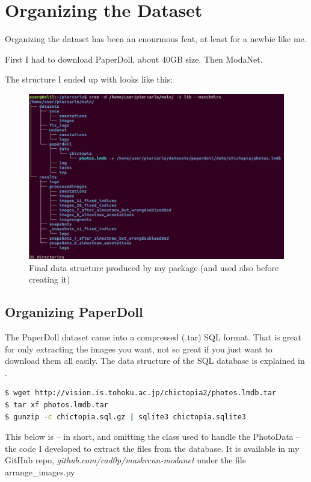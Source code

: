 \section{Organizing the Dataset}\label{s:ds-org}

Organizing the dataset has been an enourmous feat, at least for a newbie like me.

First I had to download PaperDoll, about 40GB size. Then ModaNet.

The structure I ended up with looks like this:

\begin{figure}[H]
	\centering
	\includegraphics[width=\linewidth]{images/datastructure}
	\caption{Final data structure produced by my package (and used also before creating it)}
	\label{f:datastructure}
\end{figure}


\subsection{Organizing PaperDoll}\label{s:ds-org-pd}

The PaperDoll dataset came into a compressed (.tar) SQL format. That is great for only extracting the images you want, not so great if you just want to download them all easily. The data structure of the SQL database is explained in .

\begin{lstlisting}[language=bash]
$ wget http://vision.is.tohoku.ac.jp/chictopia2/photos.lmdb.tar
$ tar xf photos.lmdb.tar
$ gunzip -c chictopia.sql.gz | sqlite3 chictopia.sqlite3
\end{lstlisting}


This below is -- in short, and omitting the class used to handle the PhotoData -- the code I developed to extract the files from the database. It is available in my GitHub repo, \emph{github.com/cad0p/maskrcnn-modanet} under the file arrange\_images.py

